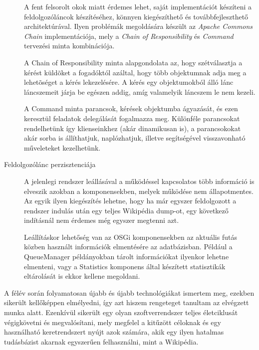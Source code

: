 \begin{description}
A fent felsorolt okok miatt érdemes lehet, saját implementációt készíteni a feldolgozóláncok készítéséhez, könnyen kiegészíthető és továbbfejleszthető architektúrával. Ilyen problémák megoldására készült az \textit{Apache Commons Chain} implementációja, mely a \textit{Chain of Responsibility} és \textit{Command} tervezési minta kombinációja.
    
A Chain of Responsibility minta alapgondolata az, hogy szétválasztja a kérést küldõket a fogadóktól azáltal, hogy több objektumnak adja meg a lehetõséget a kérés lekezelésére. A kérés egy objektumokból álló lánc láncszemeit járja be egészen addig, amíg valamelyik láncszem le nem kezeli.
    
A Command minta parancsok, kérések objektumba ágyazását, és ezen keresztül feladatok delegálását fogalmazza meg. Különféle parancsokat rendelhetünk így klienseinkhez (akár dinamikusan is), a parancsokokat akár sorba is állíthatjuk, naplózhatjuk, illetve segítségével visszavonható műveleteket kezelhetünk.
    
    \item[Feldolgozólánc perzisztenciája]

A jelenlegi rendszer leállásával a működéssel kapcsolatos több információ is elveszik azokban a komponensekben, melyek működése nem állapotmentes. Az egyik ilyen kiegészítés lehetne, hogy ha már egyszer feldolgozott a rendszer indulás után egy teljes Wikipédia dump-ot, egy következő indításnál nem érdemes még egyszer megtenni azt.

Leállításkor lehetőség van az OSGi komponensekben az aktuális futás közben használt információk elmentésére az adatbázisban. Például a QueueManager példányokban tárolt információkat ilyenkor lehetne elmenteni, vagy a Statistics komponens által készített statisztikák eltárolását is ekkor kellene megoldani.
\end{description}

A félév során folyamatosan újabb és újabb technológiákat ismertem meg, ezekben sikerült kellőképpen elmélyedni, így azt hiszem rengeteget tanultam az elvégzett munka alatt. Ezenkívül sikerült egy olyan szoftverrendszer teljes életciklusát végigkövetni és megvalósítani, mely megfelel a kitűzött céloknak és egy használható keretrendszert nyújt azok számára, akik egy ilyen hatalmas tudásbázist akarnak egyszerűen felhasználni, mint a Wikipédia.

